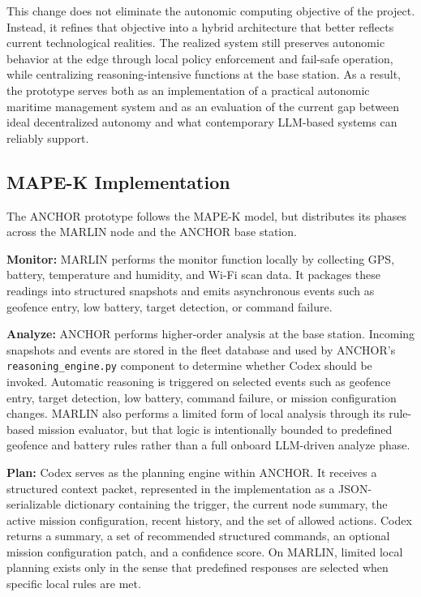 \documentclass[journal]{IEEEtran}
\begin{document}
This change does not eliminate the autonomic computing objective of the project. Instead, it refines that objective into a hybrid architecture that better reflects current technological realities. The realized system still preserves autonomic behavior at the edge through local policy enforcement and fail-safe operation, while centralizing reasoning-intensive functions at the base station. As a result, the prototype serves both as an implementation of a practical autonomic maritime management system and as an evaluation of the current gap between ideal decentralized autonomy and what contemporary LLM-based systems can reliably support.

\subsection{MAPE-K Implementation}
The ANCHOR prototype follows the MAPE-K model, but distributes its phases across the MARLIN node and the ANCHOR base station.

\textbf{Monitor:} MARLIN performs the monitor function locally by collecting GPS, battery, temperature and humidity, and Wi-Fi scan data. It packages these readings into structured snapshots and emits asynchronous events such as geofence entry, low battery, target detection, or command failure.

\textbf{Analyze:} ANCHOR performs higher-order analysis at the base station. Incoming snapshots and events are stored in the fleet database and used by ANCHOR's \texttt{reasoning\_engine.py} component to determine whether Codex should be invoked. Automatic reasoning is triggered on selected events such as geofence entry, target detection, low battery, command failure, or mission configuration changes. MARLIN also performs a limited form of local analysis through its rule-based mission evaluator, but that logic is intentionally bounded to predefined geofence and battery rules rather than a full onboard LLM-driven analyze phase.

\textbf{Plan:} Codex serves as the planning engine within ANCHOR. It receives a structured context packet, represented in the implementation as a JSON-serializable dictionary containing the trigger, the current node summary, the active mission configuration, recent history, and the set of allowed actions. Codex returns a summary, a set of recommended structured commands, an optional mission configuration patch, and a confidence score. On MARLIN, limited local planning exists only in the sense that predefined responses are selected when specific local rules are met.
\end{document}

